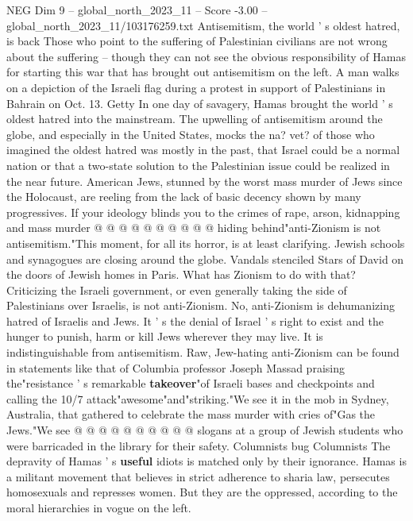 \begin{textsample}{NEG Dim 9 – global\_north\_2023\_11 – Score -3.00 – global\_north\_2023\_11/103176259.txt}  \label{ex:f9_neg_297}
Antisemitism, the world ' s oldest hatred, is back Those who point to the suffering of Palestinian civilians are not wrong about the suffering -- though they can not see the obvious responsibility of Hamas for starting this war that has brought out antisemitism on the left.
A man walks on a depiction of the Israeli flag during a protest in support of Palestinians in Bahrain on Oct. 13.
Getty In one day of savagery, Hamas brought the world ' s oldest hatred into the mainstream.
The upwelling of antisemitism around the globe, and especially in the United States, mocks the na? vet? of those who imagined the oldest hatred was mostly in the past, that Israel could be a normal nation or that a two-state solution to the Palestinian issue could be realized in the near future.
American Jews, stunned by the worst mass murder of Jews since the Holocaust, are reeling from the lack of basic decency shown by many progressives.
If your ideology blinds you to the crimes of rape, arson, kidnapping and mass murder @ @ @ @ @ @ @ @ @ @ hiding behind"anti-Zionism is not antisemitism."This moment, for all its horror, is at least clarifying.
Jewish schools and synagogues are closing around the globe.
Vandals stenciled Stars of David on the doors of Jewish homes in Paris.
What has Zionism to do with that?
Criticizing the Israeli government, or even generally taking the side of Palestinians over Israelis, is not anti-Zionism.
No, anti-Zionism is dehumanizing hatred of Israelis and Jews.
It ' s the denial of Israel ' s right to exist and the hunger to punish, harm or kill Jews wherever they may live.
It is indistinguishable from antisemitism.
Raw, Jew-hating anti-Zionism can be found in statements like that of Columbia professor Joseph Massad praising the"resistance ' s remarkable \textbf{takeover}"of Israeli bases and checkpoints and calling the 10/7 attack"awesome"and"striking."We see it in the mob in Sydney, Australia, that gathered to celebrate the mass murder with cries of"Gas the Jews."We see @ @ @ @ @ @ @ @ @ @ slogans at a group of Jewish students who were barricaded in the library for their safety.
Columnists bug Columnists The depravity of Hamas ' s \textbf{useful} idiots is matched only by their ignorance.
Hamas is a militant movement that believes in strict adherence to sharia law, persecutes homosexuals and represses women.
But they are the oppressed, according to the moral hierarchies in vogue on the left.

\end{textsample}
